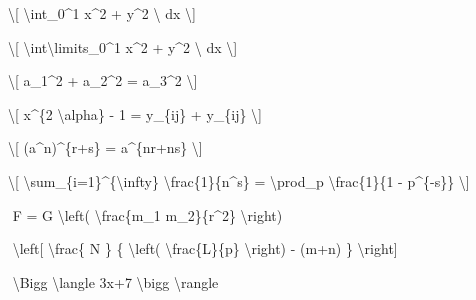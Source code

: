 \documentclass[12pt,a4paper,oneside,]{article}
\newenvironment{Shaded}{\begin{snugshade}}{\end{snugshade}}
\newcommand{\SpecialCharTok}[1]{\textcolor[rgb]{0.00,0.00,0.00}{#1}}
\newcommand{\SpecialStringTok}[1]{\textcolor[rgb]{0.31,0.60,0.02}{#1}}
\numberwithin{dummy}{section}
\theoremstyle{ocrenumbox}
\theoremstyle{blacknumex}
\theoremstyle{blacknumbox}
\theoremstyle{ocrenum}
\theoremstyle{ocrenum}
\begin{document}
\begin{Shaded}
\begin{Highlighting}[]
\SpecialStringTok{\textbackslash{}[ }\SpecialCharTok{\textbackslash{}int}\SpecialStringTok{\_0\^{}1 x\^{}2 + y\^{}2 }\SpecialCharTok{\textbackslash{} }\SpecialStringTok{dx \textbackslash{}]}

\SpecialStringTok{\textbackslash{}[ }\SpecialCharTok{\textbackslash{}int\textbackslash{}limits}\SpecialStringTok{\_0\^{}1 x\^{}2 + y\^{}2 }\SpecialCharTok{\textbackslash{} }\SpecialStringTok{dx \textbackslash{}]}

\SpecialStringTok{\textbackslash{}[ a\_1\^{}2 + a\_2\^{}2 = a\_3\^{}2 \textbackslash{}]}

\SpecialStringTok{\textbackslash{}[ x\^{}\{2 }\SpecialCharTok{\textbackslash{}alpha}\SpecialStringTok{\} {-} 1 = y\_\{ij\} + y\_\{ij\}  \textbackslash{}]}

\SpecialStringTok{\textbackslash{}[ (a\^{}n)\^{}\{r+s\} = a\^{}\{nr+ns\}  \textbackslash{}]}

\SpecialStringTok{\textbackslash{}[ }\SpecialCharTok{\textbackslash{}sum}\SpecialStringTok{\_\{i=1\}\^{}\{}\SpecialCharTok{\textbackslash{}infty}\SpecialStringTok{\} }\SpecialCharTok{\textbackslash{}frac}\SpecialStringTok{\{1\}\{n\^{}s\} }
\SpecialStringTok{= }\SpecialCharTok{\textbackslash{}prod}\SpecialStringTok{\_p }\SpecialCharTok{\textbackslash{}frac}\SpecialStringTok{\{1\}\{1 {-} p\^{}\{{-}s\}\} \textbackslash{}]}

\SpecialStringTok{$$ }
\SpecialStringTok{F = G }\SpecialCharTok{\textbackslash{}left}\SpecialStringTok{( }\SpecialCharTok{\textbackslash{}frac}\SpecialStringTok{\{m\_1 m\_2\}\{r\^{}2\} }\SpecialCharTok{\textbackslash{}right}\SpecialStringTok{)}
\SpecialStringTok{$$}

\SpecialStringTok{$$ }
\SpecialStringTok{ }\SpecialCharTok{\textbackslash{}left}\SpecialStringTok{[  }\SpecialCharTok{\textbackslash{}frac}\SpecialStringTok{\{ N \} \{ }\SpecialCharTok{\textbackslash{}left}\SpecialStringTok{( }\SpecialCharTok{\textbackslash{}frac}\SpecialStringTok{\{L\}\{p\} }\SpecialCharTok{\textbackslash{}right}\SpecialStringTok{)  {-} (m+n) \}  }\SpecialCharTok{\textbackslash{}right}\SpecialStringTok{]}
\SpecialStringTok{$$}

\SpecialStringTok{$$}
\SpecialStringTok{ }\SpecialCharTok{\textbackslash{}Bigg}\SpecialStringTok{ }\SpecialCharTok{\textbackslash{}langle}\SpecialStringTok{ 3x+7 }\SpecialCharTok{\textbackslash{}bigg}\SpecialStringTok{ }\SpecialCharTok{\textbackslash{}rangle}
\SpecialStringTok{$$}
\end{Highlighting}
\end{Shaded}
\end{document}
